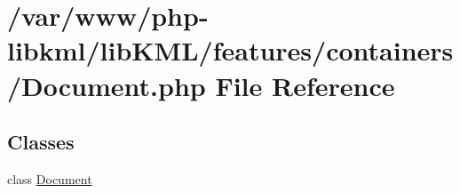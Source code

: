 \hypertarget{Document_8php}{
\section{/var/www/php-\/libkml/libKML/features/containers/Document.php File Reference}
\label{d3/df7/Document_8php}
}
\subsection*{Classes}
\begin{DoxyCompactItemize}
\item 
class \hyperlink{classDocument}{Document}
\end{DoxyCompactItemize}

